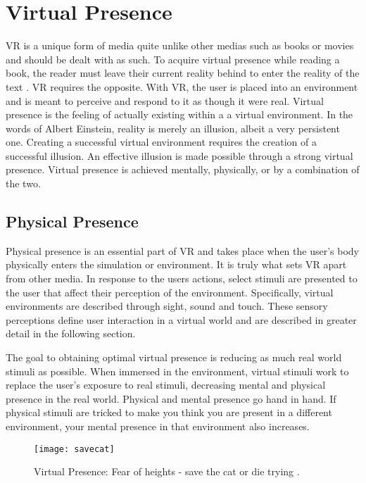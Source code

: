 \section{Virtual Presence}\label{presence}

VR is a unique form of media quite unlike other medias such as books or movies and should be dealt with as such. To acquire virtual presence while reading a book, the reader must leave their current reality behind to enter the reality of the text \cite{mihelj_apps}. VR requires the opposite. With VR, the user is placed into an environment and is meant to perceive and respond to it as though it were real. Virtual presence is the feeling of actually existing within a a virtual environment. In the words of Albert Einstein, reality is merely an illusion, albeit a very persistent one. Creating a successful virtual environment requires the creation of a successful illusion.  An effective illusion is made possible through a strong virtual presence. Virtual presence is achieved mentally, physically, or by a combination of the two. 

\subsection{Physical Presence}\label{physical presence}

Physical presence is an essential part of VR and takes place when the user's body physically enters the simulation or environment. It is truly what sets VR apart from other media.  In response to the users actions, select stimuli are presented to the user that affect their perception of the environment. Specifically, virtual environments are described through sight, sound and touch. These sensory perceptions define user interaction in a virtual world and are described in greater detail in the following section. 
	
\par The goal to obtaining optimal virtual presence is reducing as much real world stimuli as possible.
When immersed in the environment, virtual stimuli work to replace the user's exposure to real stimuli, decreasing mental and physical presence in the real world. Physical and mental presence go hand in hand. If physical stimuli are tricked to make you think you are present in a different environment, your mental presence in that environment also increases. 
	
	
	\begin{figure}[h]
		\centering
		\texttt{[image: savecat]}
		\caption{Virtual Presence: Fear of heights - save the cat or die trying \cite{matulef}.}

		\label{fig:savecat}
	\end{figure}
	
